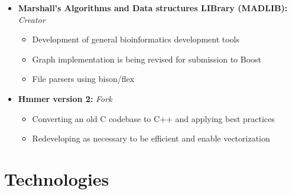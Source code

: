 \documentclass[10pt,a4paper,sans]{moderncv}        %
\begin{document}
\begin{itemize}

\item{\textbf{Marshall's Algorithms and Data structures LIBrary (MADLIB):} \textit{Creator}

\vspace{3pt}

\small{
\begin{itemize}
\item Development of general bioinformatics development tools
\item Graph implementation is being revised for submission to Boost
\item File parsers using bison/flex
\end{itemize}
}}

\vspace{6pt}

\item{\textbf{Hmmer version 2:} \textit{Fork}

\vspace{3pt}

\small{
\begin{itemize}
\item Converting an old C codebase to C++ and applying best practices
\item Redeveloping as necessary to be efficient and enable vectorization
\end{itemize}
}}

\end{itemize}

\vspace{2pt}

%
%
%
%


\section{Technologies}
\end{document}
